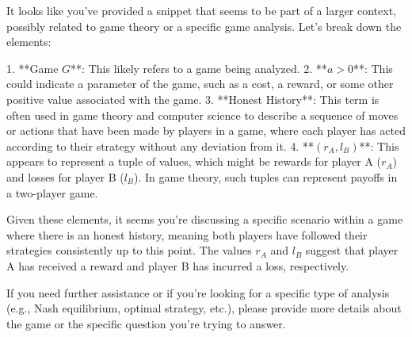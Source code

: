 It looks like you've provided a snippet that seems to be part of a larger context, possibly related to game theory or a specific game analysis. Let's break down the elements:

1. **Game \( G \)**: This likely refers to a game being analyzed.
2. **\( a > 0 \)**: This could indicate a parameter of the game, such as a cost, a reward, or some other positive value associated with the game.
3. **Honest History**: This term is often used in game theory and computer science to describe a sequence of moves or actions that have been made by players in a game, where each player has acted according to their strategy without any deviation from it.
4. **\((r_A, l_B)\)**: This appears to represent a tuple of values, which might be rewards for player A (\( r_A \)) and losses for player B (\( l_B \)). In game theory, such tuples can represent payoffs in a two-player game.

Given these elements, it seems you're discussing a specific scenario within a game where there is an honest history, meaning both players have followed their strategies consistently up to this point. The values \( r_A \) and \( l_B \) suggest that player A has received a reward and player B has incurred a loss, respectively.

If you need further assistance or if you're looking for a specific type of analysis (e.g., Nash equilibrium, optimal strategy, etc.), please provide more details about the game or the specific question you're trying to answer.